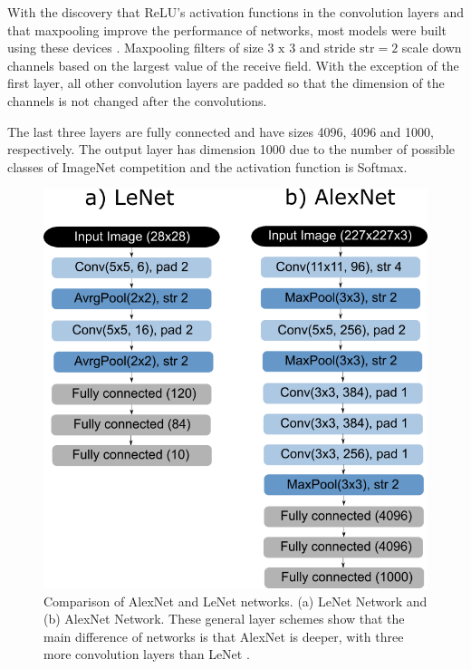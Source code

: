 With the discovery that ReLU's activation functions in the convolution layers and that maxpooling improve the performance of networks, most models were built using these devices \cite{zhang2020dive}. Maxpooling filters of size $3\text{ x }3$ and stride $\text{str} = 2$ scale down channels based on the largest value of the receive field. With the exception of the first layer, all other convolution layers are padded so that the dimension of the channels is not changed after the convolutions.

The last three layers are fully connected and have sizes 4096, 4096 and 1000, respectively. The output layer has dimension 1000 due to the number of possible classes of ImageNet competition and the activation function is Softmax.

\begin{figure}
    \centering
    \includegraphics[scale=0.4]{"Part 3 - Learning Systems/Supervised Learning/Deep Learning/images/figure129.png"}
    \caption{ Comparison of AlexNet and LeNet networks. (a) LeNet Network and (b)  AlexNet Network. These general layer schemes show that the main difference of networks is that AlexNet is deeper, with three more convolution layers than LeNet \cite{zhang2020dive}.}
    \label{fig:lenetalexnet}
\end{figure}

